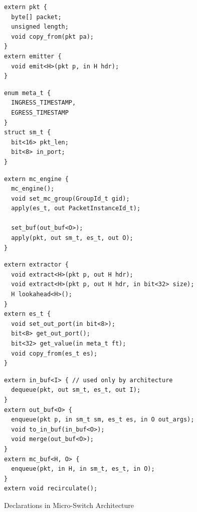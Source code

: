 \documentclass[letterpaper,twocolumn,10pt]{article}
\begin{document}
\begin{figure}
\begin{minipage}[t]{.35\textwidth}
\begin{lstlisting}[frame=none]
extern pkt {
  byte[] packet;
  unsigned length;
  void copy_from(pkt pa);
}
extern emitter {
  void emit<H>(pkt p, in H hdr);
}
\end{lstlisting}
\end{minipage}\vline
\hfill\begin{minipage}[t]{.22\textwidth}
\begin{lstlisting}[frame=none]
enum meta_t {
  INGRESS_TIMESTAMP,
  EGRESS_TIMESTAMP
}
struct sm_t {
  bit<16> pkt_len;
  bit<8> in_port;
}
\end{lstlisting}
\end{minipage}\vline
\hfill\begin{minipage}[t]{.41\textwidth}
\begin{lstlisting}[frame=none]
extern mc_engine {
  mc_engine();
  void set_mc_group(GroupId_t gid);
  apply(es_t, out PacketInstanceId_t);
  
  set_buf(out_buf<O>);
  apply(pkt, out sm_t, es_t, out O);  
}
\end{lstlisting}
\end{minipage}
\begin{minipage}[t]{0.40\textwidth}
\begin{lstlisting}[frame=none]
extern extractor {
  void extract<H>(pkt p, out H hdr);
  void extract<H>(pkt p, out H hdr, in bit<32> size);
  H lookahead<H>();
}
extern es_t {
  void set_out_port(in bit<8>);
  bit<8> get_out_port();
  bit<32> get_value(in meta_t ft);
  void copy_from(es_t es);
}
\end{lstlisting}
\end{minipage}\vline
\hfill\noindent\begin{minipage}[t]{0.57\textwidth}
\begin{lstlisting}[frame=none]
extern in_buf<I> { // used only by architecture
  dequeue(pkt, out sm_t, es_t, out I);
}
extern out_buf<O> {
  enqueue(pkt p, in sm_t sm, es_t es, in O out_args);
  void to_in_buf(in_buf<O>);
  void merge(out_buf<O>);
}
extern mc_buf<H, O> {
  enqueue(pkt, in H, in sm_t, es_t, in O);
}
extern void recirculate();
\end{lstlisting}
\end{minipage}
\caption{Declarations in Micro-Switch Architecture}
\label{fig:micro-switch-architecture}
\end{figure}
\end{document}
